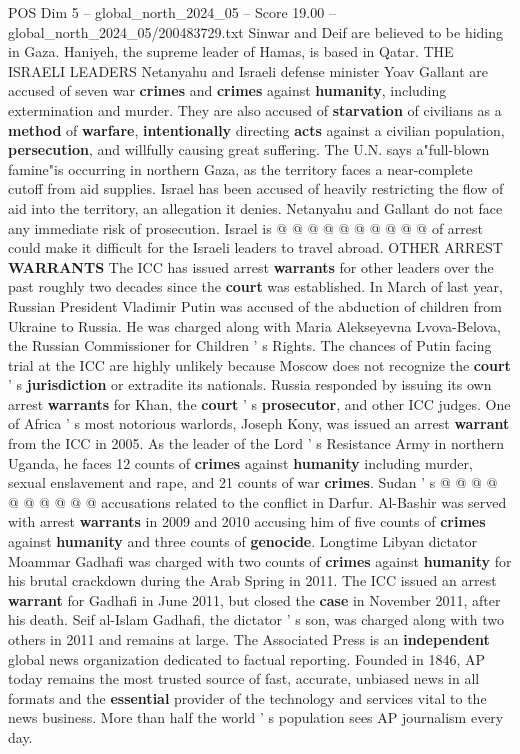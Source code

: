 \begin{textsample}{POS Dim 5 – global\_north\_2024\_05 – Score 19.00 – global\_north\_2024\_05/200483729.txt}
Sinwar and Deif are believed to be hiding in Gaza.
Haniyeh, the supreme leader of Hamas, is based in Qatar.
THE ISRAELI LEADERS Netanyahu and Israeli defense minister Yoav Gallant are accused of seven war \textbf{crimes} and \textbf{crimes} against \textbf{humanity}, including extermination and murder.
They are also accused of \textbf{starvation} of civilians as a \textbf{method} of \textbf{warfare}, \textbf{intentionally} directing \textbf{acts} against a civilian population, \textbf{persecution}, and willfully causing great suffering.
The U.N. says a"full-blown famine"is occurring in northern Gaza, as the territory faces a near-complete cutoff from aid supplies.
Israel has been accused of heavily restricting the flow of aid into the territory, an allegation it denies.
Netanyahu and Gallant do not face any immediate risk of prosecution.
Israel is @ @ @ @ @ @ @ @ @ @ of arrest could make it difficult for the Israeli leaders to travel abroad.
OTHER ARREST \textbf{WARRANTS} The ICC has issued arrest \textbf{warrants} for other leaders over the past roughly two decades since the \textbf{court} was established.
In March of last year, Russian President Vladimir Putin was accused of the abduction of children from Ukraine to Russia.
He was charged along with Maria Alekseyevna Lvova-Belova, the Russian Commissioner for Children ' s Rights.
The chances of Putin facing trial at the ICC are highly unlikely because Moscow does not recognize the \textbf{court} ' s \textbf{jurisdiction} or extradite its nationals.
Russia responded by issuing its own arrest \textbf{warrants} for Khan, the \textbf{court} ' s \textbf{prosecutor}, and other ICC judges.
One of Africa ' s most notorious warlords, Joseph Kony, was issued an arrest \textbf{warrant} from the ICC in 2005.
As the leader of the Lord ' s Resistance Army in northern Uganda, he faces 12 counts of \textbf{crimes} against \textbf{humanity} including murder, sexual enslavement and rape, and 21 counts of war \textbf{crimes}.
Sudan ' s @ @ @ @ @ @ @ @ @ @ accusations related to the conflict in Darfur.
Al-Bashir was served with arrest \textbf{warrants} in 2009 and 2010 accusing him of five counts of \textbf{crimes} against \textbf{humanity} and three counts of \textbf{genocide}.
Longtime Libyan dictator Moammar Gadhafi was charged with two counts of \textbf{crimes} against \textbf{humanity} for his brutal crackdown during the Arab Spring in 2011.
The ICC issued an arrest \textbf{warrant} for Gadhafi in June 2011, but closed the \textbf{case} in November 2011, after his death.
Seif al-Islam Gadhafi, the dictator ' s son, was charged along with two others in 2011 and remains at large.
The Associated Press is an \textbf{independent} global news organization dedicated to factual reporting.
Founded in 1846, AP today remains the most trusted source of fast, accurate, unbiased news in all formats and the \textbf{essential} provider of the technology and services vital to the news business.
More than half the world ' s population sees AP journalism every day.


\end{textsample}
